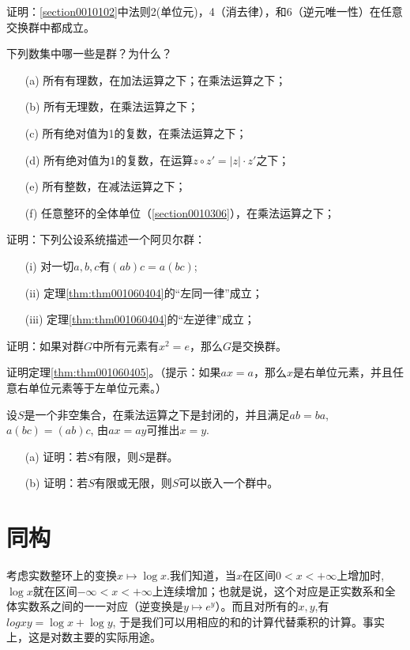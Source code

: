 \begin{problemset}
\item 证明：\ref{section0010102}中法则2(单位元)，4（消去律），和6（逆元唯一性）在任意交换群中都成立。

\item 下列数集中哪一些是群？为什么？
\begin{enumerate}
\item[(a)] 所有有理数，在加法运算之下；在乘法运算之下；
\item[(b)] 所有无理数，在乘法运算之下；
\item[(c)] 所有绝对值为1的复数，在乘法运算之下；
\item[(d)] 所有绝对值为1的复数，在运算$z \circ z' = |z| \cdot z'$之下；
\item[(e)] 所有整数，在减法运算之下；
\item[(f)] 任意整环的全体单位（\ref{section0010306}），在乘法运算之下；
\end{enumerate}

\item 证明：下列公设系统描述一个阿贝尔群：
\begin{enumerate}
\item[(i)] 对一切$a,b,c$有$(ab)c = a(bc)$;
\item[(ii)]定理\ref{thm:thm001060404}的“左同一律”成立；
\item[(iii)]定理\ref{thm:thm001060404}的“左逆律”成立；
\end{enumerate}

\item 证明：如果对群$G$中所有元素有$x^2=e$，那么$G$是交换群。

\item 证明定理\ref{thm:thm001060405}。（提示：如果$ax=a$，那么$x$是右单位元素，并且任意右单位元素等于左单位元素。）

\item 设$S$是一个非空集合，在乘法运算之下是封闭的，并且满足$ab=ba$, $a(bc)= (ab)c$, 由$ax=ay$可推出$x=y$.
\begin{enumerate}
\item[(a)]证明：若$S$有限，则$S$是群。
\item[(b)]证明：若$S$有限或无限，则$S$可以嵌入一个群中。
\end{enumerate}

\end{problemset}




\section{同构}\label{section0010605}
考虑实数整环上的变换$x \mapsto \log{x}$.我们知道，当$x$在区间$0 < x < +\infty$上增加时, $\log{x}$就在区间$-\infty < x < +\infty$上连续增加；也就是说，这个对应是正实数系和全体实数系之间的一一对应（逆变换是$y \mapsto e^{y}$）。而且对所有的$x, y$,有$log{xy} = \log{x} + \log{y}$, 于是我们可以用相应的和的计算代替乘积的计算。事实上，这是对数主要的实际用途。

